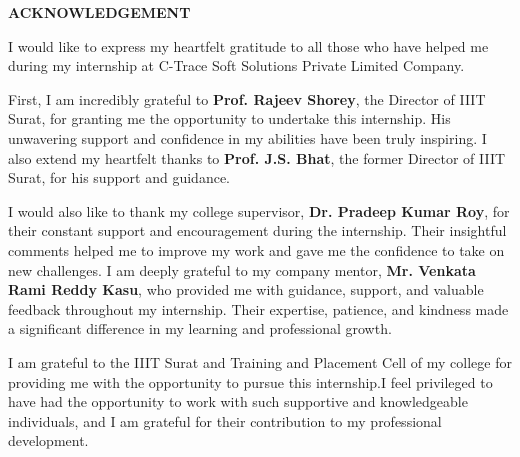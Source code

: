 \thispagestyle{plain}

\begin{center}
 \Large {\textbf \uppercase{Acknowledgement}}
\end{center}

\vspace{3\baselineskip}
\justify
I would like to express my heartfelt gratitude to all those who have helped me during my internship at C-Trace Soft Solutions Private Limited Company.

First, I am incredibly grateful to \textbf{Prof. Rajeev Shorey}, the Director of IIIT
Surat, for granting me the opportunity to undertake this internship.
His unwavering support and confidence in my abilities have been truly inspiring.
I also extend my heartfelt thanks to \textbf{Prof. J.S. Bhat}, the former Director of IIIT Surat, for his
support and guidance.

I would also like to thank my college supervisor, \textbf{Dr. Pradeep Kumar Roy}, for their constant support and encouragement during the internship.
Their insightful comments helped me to improve my work and gave me the confidence to take on new challenges.
I am deeply grateful to my company mentor,\textbf{ Mr. Venkata Rami Reddy Kasu}, who provided me with guidance, support, and valuable feedback throughout my internship.
Their expertise, patience, and kindness made a significant difference in my learning and professional growth.

I am grateful to the IIIT Surat and Training and Placement Cell of my college for providing me with the opportunity to pursue this internship.I feel privileged to have had the opportunity to work with such supportive and knowledgeable individuals, and I am grateful for their contribution to my professional development.


 
